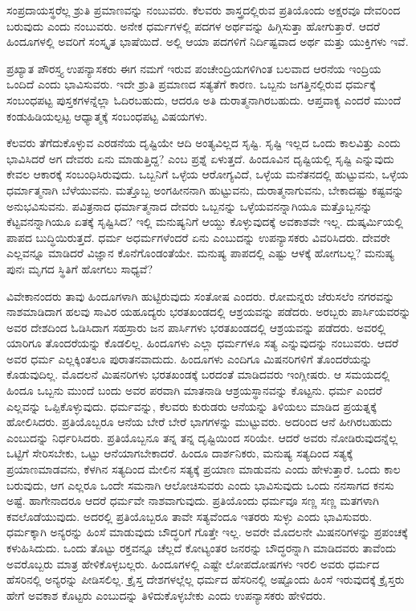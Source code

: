 ಸಂಪ್ರದಾಯಸ್ಥರೆಲ್ಲ ಶ್ರುತಿ ಪ್ರಮಾಣವನ್ನು ನಂಬುವರು. ಕೆಲವರು ಶಾಸ್ತ್ರದಲ್ಲಿರುವ ಪ್ರತಿಯೊಂದು ಅಕ್ಷರವೂ ದೇವರಿಂದ ಬರುವುದು ಎಂದು ನಂಬುವರು. ಅನೇಕ ಧರ್ಮಗಳಲ್ಲಿ ಪದಗಳ ಅರ್ಥವನ್ನು ಹಿಗ್ಗಿಸುತ್ತಾ ಹೋಗುತ್ತಾರೆ. ಆದರೆ ಹಿಂದೂಗಳಲ್ಲಿ ಅವರಿಗೆ ಸಂಸ್ಕೃತ ಭಾಷೆಯಿದೆ. ಅಲ್ಲಿ ಆಯಾ ಪದಗಳಿಗೆ ನಿರ್ದಿಷ್ಟವಾದ ಅರ್ಥ ಮತ್ತು ಯುಕ್ತಿಗಳು ಇವೆ.

ಪ್ರಖ್ಯಾತ ಪೌರಸ್ತ್ಯ ಉಪನ್ಯಾಸಕರು ಈಗ ನಮಗೆ ಇರುವ ಪಂಚೇಂದ್ರಿಯಗಳಿಗಿಂತ ಬಲವಾದ ಆರನೆಯ ಇಂದ್ರಿಯ ಒಂದಿದೆ ಎಂದು ಭಾವಿಸುವರು. ಇದೇ ಶ್ರುತಿ ಪ್ರಮಾಣದ ಸತ್ಯತೆಗೆ ಕಾರಣ. ಒಬ್ಬನು ಜಗತ್ತಿನಲ್ಲಿರುವ ಧರ್ಮಕ್ಕೆ ಸಂಬಂಧಪಟ್ಟ ಪುಸ್ತಕಗಳನ್ನೆಲ್ಲಾ ಓದಿರಬಹುದು, ಆದರೂ ಅತಿ ದುರಾತ್ಮನಾಗಿರಬಹುದು. ಆಪ್ತವಾಕ್ಯ ಎಂದರೆ ಮುಂದೆ ಕಂಡುಹಿಡಿಯಲ್ಪಟ್ಟ ಆಧ್ಯಾತ್ಮಕ್ಕೆ ಸಂಬಂಧಪಟ್ಟ ವಿಷಯಗಳು.

ಕೆಲವರು ತೆಗೆದುಕೊಳ್ಳುವ ಎರಡನೆಯ ದೃಷ್ಟಿಯೇ ಆದಿ ಅಂತ್ಯವಿಲ್ಲದ ಸೃಷ್ಟಿ. ಸೃಷ್ಟಿ ಇಲ್ಲದ ಒಂದು ಕಾಲವಿತ್ತು ಎಂದು ಭಾವಿಸಿದರೆ ಅಗ ದೇವರು ಏನು ಮಾಡುತ್ತಿದ್ದ? ಎಂಬ ಪ್ರಶ್ನೆ ಏಳುತ್ತದೆ. ಹಿಂದೂವಿನ ದೃಷ್ಟಿಯಲ್ಲಿ ಸೃಷ್ಟಿ ಎನ್ನುವುದು ಕೇವಲ ಆಕಾರಕ್ಕೆ ಸಂಬಂಧಿಸಿರುವುದು. ಒಬ್ಬನಿಗೆ ಒಳ್ಳೆಯ ಆರೋಗ್ಯವಿದೆ, ಒಳ್ಳೆಯ ಮನೆತನದಲ್ಲಿ ಹುಟ್ಟುವನು, ಒಳ್ಳೆಯ ಧರ್ಮಾತ್ಮನಾಗಿ ಬೆಳೆಯುವನು. ಮತ್ತೊಬ್ಬ ಅಂಗಹೀನನಾಗಿ ಹುಟ್ಟುವನು, ದುರಾತ್ಮನಾಗುವನು, ಬೇಕಾದಷ್ಟು ಕಷ್ಟವನ್ನು ಅನುಭವಿಸುವನು. ಪವಿತ್ರನಾದ ಧರ್ಮಾತ್ಮನಾದ ದೇವರು ಒಬ್ಬನನ್ನು ಒಳ್ಳೆಯವನನ್ನಾಗಿಯೂ ಮತ್ತೊಬ್ಬನನ್ನು ಕೆಟ್ಟವನನ್ನಾ\break ಗಿಯೂ ಏತಕ್ಕೆ ಸೃಷ್ಟಿಸಿದ? ಇಲ್ಲಿ ಮನುಷ್ಯನಿಗೆ ಆಯ್ದು ಕೊಳ್ಳುವುದಕ್ಕೆ ಅವಕಾಶವೇ ಇಲ್ಲ. ದುಷ್ಕರ್ಮಿಯಲ್ಲಿ ಪಾಪದ ಬುದ್ಧಿಯಿರುತ್ತದೆ. ಧರ್ಮ ಅಧರ್ಮಗಳೆಂದರೆ ಏನು ಎಂಬುದನ್ನು ಉಪನ್ಯಾಸಕರು ವಿವರಿಸಿದರು. ದೇವರೇ ಎಲ್ಲವನ್ನೂ ಮಾಡಿದರೆ ವಿಜ್ಞಾನ ಕೊನೆಗೊಂಡಂತೆಯೇ. ಮನುಷ್ಯ ಪಾಪದಲ್ಲಿ ಎಷ್ಟು ಆಳಕ್ಕೆ ಹೋಗಬಲ್ಲ? ಮನುಷ್ಯ ಪುನಃ ಮೃಗದ ಸ್ಥಿತಿಗೆ ಹೋಗಲು ಸಾಧ್ಯವೆ?

ವಿವೇಕಾನಂದರು ತಾವು ಹಿಂದೂಗಳಾಗಿ ಹುಟ್ಟಿರುವುದು ಸಂತೋಷ ಎಂದರು. ರೋಮನ್ನರು ಜೆರುಸಲೆಂ ನಗರವನ್ನು ನಾಶಮಾಡಿದಾಗ ಹಲವು ಸಾವಿರ ಯಹೂದ್ಯರು ಭರತಖಂಡದಲ್ಲಿ ಆಶ್ರಯವನ್ನು ಪಡೆದರು. ಅರಬ್ಬರು ಪಾರ್ಸಿಯವರನ್ನು ಅವರ ದೇಶದಿಂದ ಓಡಿಸಿದಾಗ ಸಹಸ್ರಾರು ಜನ ಪಾರ್ಸಿಗಳು ಭರತಖಂಡದಲ್ಲಿ ಆಶ್ರಯವನ್ನು ಪಡೆದರು. ಅವರಲ್ಲಿ ಯಾರಿಗೂ ತೊಂದರೆಯನ್ನು ಕೊಡಲಿಲ್ಲ. ಹಿಂದೂಗಳು ಎಲ್ಲಾ ಧರ್ಮಗಳೂ ಸತ್ಯ ಎನ್ನುವುದನ್ನು ನಂಬುವರು. ಆದರೆ ಅವರ ಧರ್ಮ ಎಲ್ಲಕ್ಕಿಂತಲೂ ಪುರಾತನವಾದುದು. ಹಿಂದೂಗಳು ಎಂದಿಗೂ ಮಿಷನರಿಗಳಿಗೆ ತೊಂದರೆಯನ್ನು ಕೊಡುವುದಿಲ್ಲ. ಮೊದಲನೆ ಮಿಷನರಿಗಳು ಭರತಖಂಡಕ್ಕೆ ಬರದಂತೆ ಮಾಡಿದವರು ಇಂಗ್ಲೀಷರು. ಆ ಸಮಯದಲ್ಲಿ ಹಿಂದೂ ಒಬ್ಬನು ಮುಂದೆ ಬಂದು ಅವರ ಪರವಾಗಿ ಮಾತನಾಡಿ ಆಶ್ರಯಸ್ಥಾನವನ್ನು ಕೊಟ್ಟನು. ಧರ್ಮ ಎಂದರೆ ಎಲ್ಲವನ್ನು ಒಪ್ಪಿಕೊಳ್ಳುವುದು. ಧರ್ಮವನ್ನು, ಕೆಲವರು ಕುರುಡರು ಆನೆಯನ್ನು ತಿಳಿಯಲು ಮಾಡಿದ ಪ್ರಯತ್ನಕ್ಕೆ ಹೋಲಿಸಿದರು. ಪ್ರತಿಯೊಬ್ಬರೂ ಆನೆಯ ಬೇರೆ ಬೇರೆ ಭಾಗಗಳನ್ನು ಮುಟ್ಟುವರು. ಅದರಿಂದ ಆನೆ ಹೀಗಿರಬಹುದು ಎಂಬುದನ್ನು ನಿರ್ಧರಿಸಿದರು. ಪ್ರತಿಯೊಬ್ಬನೂ ತನ್ನ ತನ್ನ ದೃಷ್ಟಿಯಿಂದ ಸರಿಯೇ. ಆದರೆ ಅವರು ನೋಡಿರುವುದನ್ನೆಲ್ಲ ಒಟ್ಟಿಗೆ ಸೇರಿಸಬೇಕು, ಒಟ್ಟು ಆನೆಯಾಗಬೇಕಾದರೆ. ಹಿಂದೂ ದಾರ್ಶನಿಕರು, ಮನುಷ್ಯ ಸತ್ಯದಿಂದ ಸತ್ಯಕ್ಕೆ ಪ್ರಯಾಣ\break ಮಾಡವನು, ಕೆಳಗಿನ ಸತ್ಯದಿಂದ ಮೇಲಿನ ಸತ್ಯಕ್ಕೆ ಪ್ರಯಾಣ ಮಾಡುವನು ಎಂದು ಹೇಳುತ್ತಾರೆ. ಒಂದು ಕಾಲ ಬರುವುದು, ಆಗ ಎಲ್ಲರೂ ಒಂದೇ ಸಮನಾಗಿ ಆಲೋಚಿಸುವರು ಎಂದು ಭಾವಿಸುವುದು ಒಂದು ನನಸಾಗದ ಕನಸು ಅಷ್ಟೆ. ಹಾಗೇನಾದರೂ ಆದರೆ ಧರ್ಮವೇ ನಾಶವಾಗುವುದು. ಪ್ರತಿಯೊಂದು ಧರ್ಮವೂ ಸಣ್ಣ ಸಣ್ಣ ಮತಗಳಾಗಿ ಕವಲೊಡೆಯುವುದು. ಅದರಲ್ಲಿ ಪ್ರತಿಯೊಬ್ಬರೂ ತಾವೇ ಸತ್ಯವೆಂದೂ ಇತರರು ಸುಳ್ಳು ಎಂದು ಭಾವಿಸುವರು. ಧರ್ಮಕ್ಕಾಗಿ ಅನ್ಯರನ್ನು ಹಿಂಸೆ ಮಾಡುವುದು ಬೌದ್ಧರಿಗೆ ಗೊತ್ತೇ ಇಲ್ಲ. ಅವರೇ ಮೊದಲನೇ ಮಿಷನರಿಗಳನ್ನು ಪ್ರಪಂಚಕ್ಕೆ ಕಳುಹಿಸಿದುದು. ಒಂದು ತೊಟ್ಟು ರಕ್ತವನ್ನೂ ಚೆಲ್ಲದೆ ಕೋಟ್ಯಂತರ ಜನರನ್ನು ಬೌದ್ಧರನ್ನಾಗಿ ಮಾಡಿದವರು ತಾವೆಂದು ಅವರೊಬ್ಬರು ಮಾತ್ರ ಹೇಳಿಕೊಳ್ಳಬಲ್ಲರು. ಹಿಂದೂಗಳಲ್ಲಿ ಎಷ್ಟೇ ಲೋಪದೋಷಗಳು ಇರಲಿ ಅವರು ಧರ್ಮದ ಹೆಸರಿನಲ್ಲಿ ಅನ್ಯರನ್ನು ಪೀಡಿಸಲಿಲ್ಲ. ಕ್ರೈಸ್ತ ದೇಶಗಳಲ್ಲೆಲ್ಲ ಧರ್ಮದ ಹೆಸರಿನಲ್ಲಿ ಅಷ್ಟೊಂದು ಹಿಂಸೆ ಇರುವುದಕ್ಕೆ ಕ್ರೈಸ್ತರು ಹೇಗೆ ಅವಕಾಶ ಕೊಟ್ಟರು ಎಂಬುದನ್ನು ತಿಳಿದುಕೊಳ್ಳಬೇಕು ಎಂದು ಉಪನ್ಯಾಸಕರು ಹೇಳಿದರು.

